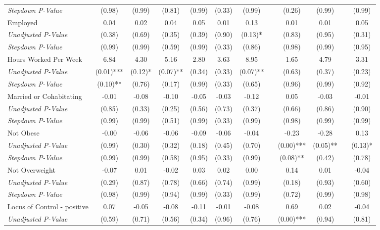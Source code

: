\begin{tabular}{l c c c c c c c c c c c}
\quad \textit{Stepdown P-Value} & (0.98) & (0.99) & (0.81) & (0.99) & (0.33) & (0.99) & & (0.26) & (0.99) & & (0.99) \\
Employed & 0.04 & 0.02 & 0.04 & 0.05 & 0.01 & 0.13 & & 0.01 & 0.01 & & 0.05 \\
\quad \textit{Unadjusted P-Value} & (0.38) & (0.69) & (0.35) & (0.39) & (0.90) & (0.13)* & & (0.83) & (0.95) & & (0.31) \\
\quad \textit{Stepdown P-Value} & (0.99) & (0.99) & (0.59) & (0.99) & (0.33) & (0.86) & & (0.98) & (0.99) & & (0.95) \\
Hours Worked Per Week & 6.84 & 4.30 & 5.16 & 2.80 & 3.63 & 8.95 & & 1.65 & 4.79 & & 3.31 \\
\quad \textit{Unadjusted P-Value} & (0.01)*** & (0.12)* & (0.07)** & (0.34) & (0.33) & (0.07)** & & (0.63) & (0.37) & & (0.23) \\
\quad \textit{Stepdown P-Value} & (0.10)** & (0.76) & (0.17) & (0.99) & (0.33) & (0.65) & & (0.96) & (0.99) & & (0.92) \\
Married or Cohabitating & -0.01 & -0.08 & -0.10 & -0.05 & -0.03 & -0.12 & & 0.05 & -0.03 & & -0.01 \\
\quad \textit{Unadjusted P-Value} & (0.85) & (0.33) & (0.25) & (0.56) & (0.73) & (0.37) & & (0.66) & (0.86) & & (0.90) \\
\quad \textit{Stepdown P-Value} & (0.99) & (0.99) & (0.51) & (0.99) & (0.33) & (0.99) & & (0.98) & (0.99) & & (0.99) \\
Not Obese & -0.00 & -0.06 & -0.06 & -0.09 & -0.06 & -0.04 & & -0.23 & -0.28 & & 0.13 \\
\quad \textit{Unadjusted P-Value} & (0.99) & (0.30) & (0.32) & (0.18) & (0.45) & (0.70) & & (0.00)*** & (0.05)** & & (0.13)* \\
\quad \textit{Stepdown P-Value} & (0.99) & (0.99) & (0.58) & (0.95) & (0.33) & (0.99) & & (0.08)** & (0.42) & & (0.78) \\
Not Overweight & -0.07 & 0.01 & -0.02 & 0.03 & 0.02 & 0.00 & & 0.14 & 0.01 & & -0.04 \\
\quad \textit{Unadjusted P-Value} & (0.29) & (0.87) & (0.78) & (0.66) & (0.74) & (0.99) & & (0.18) & (0.93) & & (0.60) \\
\quad \textit{Stepdown P-Value} & (0.98) & (0.99) & (0.94) & (0.99) & (0.33) & (0.99) & & (0.72) & (0.99) & & (0.98) \\
Locus of Control - positive & 0.07 & -0.05 & -0.08 & -0.11 & -0.01 & -0.08 & & 0.69 & 0.02 & & -0.04 \\
\quad \textit{Unadjusted P-Value} & (0.59) & (0.71) & (0.56) & (0.34) & (0.96) & (0.76) & & (0.00)*** & (0.94) & & (0.81) \\

\end{tabular}
